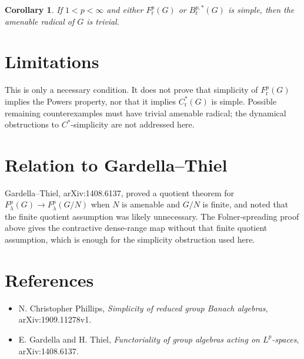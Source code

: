 \documentclass[11pt]{article}
\newtheorem{corollary}{Corollary}
\begin{document}
\begin{corollary}
If $1<p<\infty$ and either $F^p_{\mathrm r}(G)$ or
$B^{p,*}_{\mathrm r}(G)$ is simple, then the amenable radical of $G$ is
trivial.
\end{corollary}

\section*{Limitations}

This is only a necessary condition. It does not prove that simplicity of
$F^p_{\mathrm r}(G)$ implies the Powers property, nor that it implies
$C^*_{\mathrm r}(G)$ is simple. Possible remaining counterexamples must have
trivial amenable radical; the dynamical obstructions to $C^*$-simplicity are
not addressed here.

\section*{Relation to Gardella--Thiel}

Gardella--Thiel, arXiv:1408.6137, proved a quotient theorem for
$F^p_\lambda(G)\to F^p_\lambda(G/N)$ when $N$ is amenable and $G/N$ is finite,
and noted that the finite quotient assumption was likely unnecessary. The
Folner-spreading proof above gives the contractive dense-range map without
that finite quotient assumption, which is enough for the simplicity obstruction
used here.

\section*{References}

\begin{itemize}
\item N. Christopher Phillips, \emph{Simplicity of reduced group Banach
algebras}, arXiv:1909.11278v1.
\item E. Gardella and H. Thiel, \emph{Functoriality of group algebras acting
on $L^p$-spaces}, arXiv:1408.6137.
\end{itemize}
\end{document}
